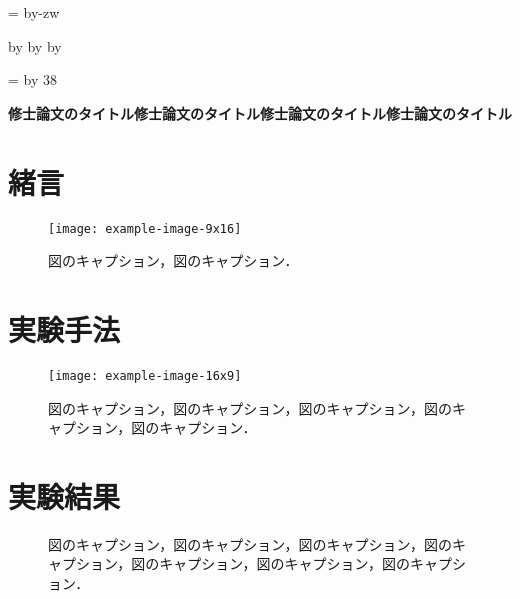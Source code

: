 \documentclass[11pt,dvipdfmx,svgnames,a4paper,uplatex]{ujarticle}
\makeatletter
\def\mojiparline#1{
  \newcounter{mpl}
  \setcounter{mpl}{#1}
  \@tempdima=\linewidth
  \advance\@tempdima by-\value{mpl}zw
  \addtocounter{mpl}{-1}
  \divide\@tempdima by \value{mpl}
  \advance\kanjiskip by\@tempdima
  \advance\parindent by\@tempdima
}
\def\linesparpage#1{
  \baselineskip=\textheight
  \divide\baselineskip by #1
}
\makeatother
\begin{document}
\mojiparline{42}  %
\linesparpage{38}  %

\centerline{\textbf{
  修士論文のタイトル修士論文のタイトル修士論文のタイトル修士論文のタイトル
}}

\section{緒言}

\begin{wrapfigure}{r}{12zw}
  \vspace*{-\intextsep}
  \centering
  \texttt{[image: example-image-9x16]}
  \caption{
    図のキャプション，図のキャプション．
  }
  \label{fig:introduction}
  \vspace*{-1.0zh} %
\end{wrapfigure}

\textcolor{LightGray}{
}


\section{実験手法}  %

\begin{wrapfigure}{r}{26zw}
  \vspace*{-1.0zh} %
  \centering
  \texttt{[image: example-image-16x9]}
  \caption{
    図のキャプション，図のキャプション，図のキャプション，図のキャプション，図のキャプション．
  }
  \label{fig:experiment}
  \vspace*{-\intextsep}
\end{wrapfigure}

\textcolor{LightGray}{
}


\section{実験結果}  %

\begin{figure}[htb]
  \centering
  \caption{
    図のキャプション，図のキャプション，図のキャプション，図のキャプション，図のキャプション，図のキャプション，図のキャプション．
  }
  \label{fig:fig_result}
  \vspace*{1.0zh}
\end{figure}
\end{document}

